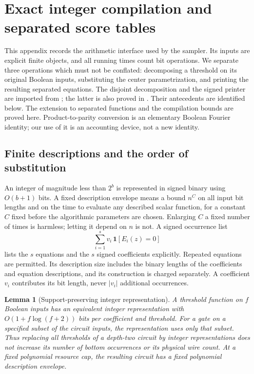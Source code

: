 \documentclass[11pt,letterpaper]{article}
\newtheorem{lemma}[theorem]{Lemma}
\theoremstyle{definition}
\theoremstyle{remark}
\newcommand{\ind}{\mathbf 1}
\begin{document}
\section{Exact integer compilation and separated score tables}
\label{alg:section}

This appendix records the arithmetic interface used by the sampler.  Its
inputs are explicit finite objects, and all running times count bit
operations.  We separate three operations which must not be conflated:
decomposing a threshold on its original Boolean inputs, substituting the
center parametrization, and printing the resulting separated equations.
The disjoint decomposition and the signed printer are imported from
\cite[Lemma~A.4 and Appendix~B]{NagCubic}; the latter is also proved in
\cite[Appendix~A]{NagGate}.  Their antecedents are identified below.  The
extension to separated functions and the compilation bounds are proved
here.  Product-to-parity conversion is an elementary Boolean Fourier
identity; our use of it is an accounting device, not a new identity.

\subsection{Finite descriptions and the order of substitution}
\label{alg:model}

An integer of magnitude less than $2^b$ is represented in signed binary
using $O(b+1)$ bits.  A fixed description envelope means a bound $n^C$ on
all input bit lengths and on the time to evaluate any described scalar
function, for a constant $C$ fixed before the algorithmic parameters are
chosen.  Enlarging $C$ a fixed number of times is harmless; letting it
depend on $n$ is not.  A signed occurrence list
\[
 \sum_{i=1}^s v_i\,\ind[E_i(z)=0]
\]
lists the $s$ equations and the $s$ signed coefficients explicitly.
Repeated equations are permitted.  Its description size includes the
binary lengths of the coefficients and equation descriptions, and its
construction is charged separately.  A coefficient $v_i$ contributes its
bit length, never $|v_i|$ additional occurrences.

\begin{lemma}[Support-preserving integer representation]
\label{alg:normalization}
A threshold function on $f$ Boolean inputs has an equivalent integer
representation with $O(1+f\log(f+2))$ bits per coefficient and threshold.
For a gate on a specified subset of the circuit inputs, the representation
uses only that subset.  Thus replacing all thresholds of a depth-two
circuit by integer representations does not increase its number of
bottom occurrences or its physical wire count.  At a fixed polynomial
resource cap, the resulting circuit has a fixed polynomial description
envelope.
\end{lemma}
\end{document}
